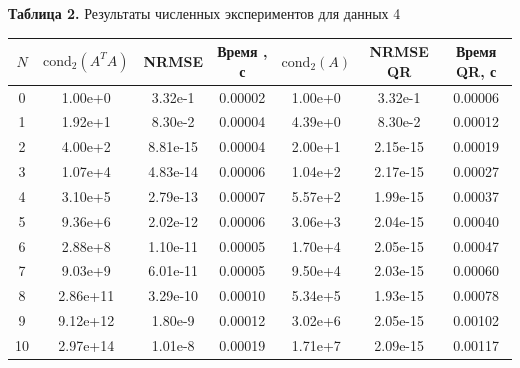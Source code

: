 \documentclass[a4paper,12pt]{article}
\begin{document}
	\noindent \textbf{Таблица 2.} Результаты численных экспериментов для данных  4
	\begin{table}[H]
		\centering
		\small
		\begin{tabular}{|c|c|c|c|c|c|c|}
			\hline
			$N$ & $\text{cond}_2(A^T A)$ & NRMSE  & Время , с & $\text{cond}_2(A)$ & NRMSE QR & Время QR, с \\ \hline
			0  & 1.00e+0  & 3.32e-1  & 0.00002 & 1.00e+0 & 3.32e-1  & 0.00006 \\ \hline
			1  & 1.92e+1  & 8.30e-2  & 0.00004 & 4.39e+0 & 8.30e-2  & 0.00012 \\ \hline
			2  & 4.00e+2  & 8.81e-15 & 0.00004 & 2.00e+1 & 2.15e-15 & 0.00019 \\ \hline
			3  & 1.07e+4  & 4.83e-14 & 0.00006 & 1.04e+2 & 2.17e-15 & 0.00027 \\ \hline
			4  & 3.10e+5  & 2.79e-13 & 0.00007 & 5.57e+2 & 1.99e-15 & 0.00037 \\ \hline
			5  & 9.36e+6  & 2.02e-12 & 0.00006 & 3.06e+3 & 2.04e-15 & 0.00040 \\ \hline
			6  & 2.88e+8  & 1.10e-11 & 0.00005 & 1.70e+4 & 2.05e-15 & 0.00047 \\ \hline
			7  & 9.03e+9  & 6.01e-11 & 0.00005 & 9.50e+4 & 2.03e-15 & 0.00060 \\ \hline
			8  & 2.86e+11 & 3.29e-10 & 0.00010 & 5.34e+5 & 1.93e-15 & 0.00078 \\ \hline
			9  & 9.12e+12 & 1.80e-9  & 0.00012 & 3.02e+6 & 2.05e-15 & 0.00102 \\ \hline
			10 & 2.97e+14 & 1.01e-8  & 0.00019 & 1.71e+7 & 2.09e-15 & 0.00117 \\ \hline
		\end{tabular}
	\end{table}
	
	\newpage
	
\end{document}
